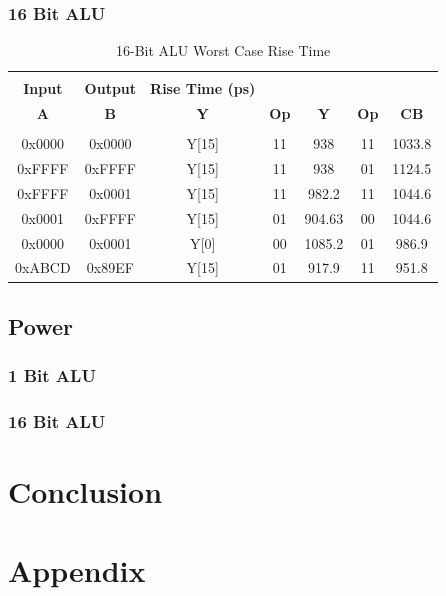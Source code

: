 \documentclass[11pt]{article}
\begin{document}
		
		\subsubsection{16 Bit ALU}
		
			\begin{table}[H]
				\centering
				\caption{16-Bit ALU Worst Case Rise Time}
				\label{tab:ALU-16-Bit-Risetime}
				\begin{tabular}{|ccccccc|}
					\hline \\
					\textbf{Input} & \textbf{Output} & \textbf{Rise Time (ps)} & \textbf{} & \textbf{} & \textbf{} & \textbf{} \\
					\textbf{A} & \textbf{B} & \textbf{Y} & \textbf{Op} & \textbf{Y} & \textbf{Op} & \textbf{CB} \\
					\hline \\
					0x0000 & 0x0000 & Y{[}15{]} & 11 & 938 & 11 & 1033.8 \\
					0xFFFF & 0xFFFF & Y{[}15{]} & 11 & 938 & 01 & 1124.5 \\
					0xFFFF & 0x0001 & Y{[}15{]} & 11 & 982.2 & 11 & 1044.6 \\
					0x0001 & 0xFFFF & Y{[}15{]} & 01 & 904.63 & 00 & 1044.6 \\
					0x0000 & 0x0001 & Y{[}0{]} & 00 & 1085.2 & 01 & 986.9 \\
					0xABCD & 0x89EF & Y{[}15{]} & 01 & 917.9 & 11 & 951.8 \\
					\hline
				\end{tabular}
			\end{table}
	
	\subsection{Power}
		
		\subsubsection{1 Bit ALU}
		
		\subsubsection{16 Bit ALU}

\section{Conclusion}


\section{Appendix}
\end{document}
